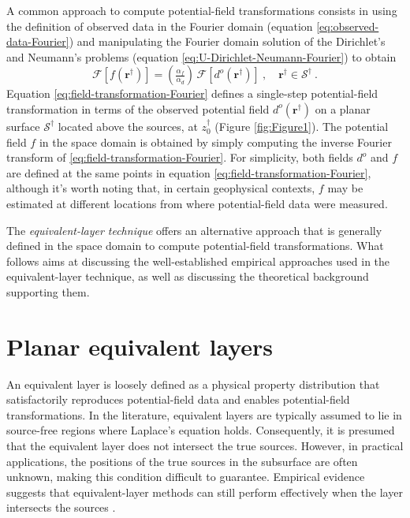\documentclass[manuscript,noblind]{geophysics}
\begin{document}
	A common approach to compute potential-field transformations \cite[e.g.,][]{gunn1975} 
	consists in using the definition of observed data in the Fourier domain (equation \ref{eq:observed-data-Fourier}) 
	and manipulating the Fourier domain solution of the Dirichlet's and Neumann's problems 
	(equation \ref{eq:U-Dirichlet-Neumann-Fourier}) to obtain
	\begin{equation}
		\mathcal{F} [ f(\mathbf{r}^{\dagger}) ] =
		\left( \tfrac{\alpha_{f}}{\alpha_{d}} \right) \, \mathcal{F} \left[ d^{o}(\mathbf{r}^{\dagger}) \right] \: , 
		\quad \mathbf{r}^{\dagger} \in \mathcal{S}^{\dagger} \: .
		\label{eq:field-transformation-Fourier}
	\end{equation}
	Equation \ref{eq:field-transformation-Fourier} defines a single-step potential-field transformation 
	in terms of the observed potential field $d^{o}(\mathbf{r}^{\dagger})$ on a planar surface $\mathcal{S}^{\dagger}$ 
	located above the sources, at $z^{\dagger}_{0}$ (Figure \ref{fig:Figure1}). 
	The potential field $f$ in the space domain is obtained by simply computing the inverse Fourier 
	transform of \ref{eq:field-transformation-Fourier}.
	For simplicity, both fields $d^o$ and $f$ are defined at the same points in equation \ref{eq:field-transformation-Fourier}, 
	although it's worth noting that, in certain geophysical contexts, $f$ may be estimated at different locations from 
	where potential-field data were measured.
	
	The \textit{equivalent-layer technique} offers an alternative approach that is generally defined in the 
	space domain to compute potential-field transformations. What follows aims at discussing the well-established 
	empirical approaches used in the equivalent-layer technique, as well as discussing the theoretical background 
	supporting them.
	
	\section{Planar equivalent layers}
	\label{eq:planar_eqlayer}
	
	An equivalent layer is loosely defined as a physical property distribution that satisfactorily 
	reproduces potential-field data and enables potential-field transformations. 
	In the literature, equivalent layers are typically assumed to lie in source-free regions where 
	Laplace’s equation holds. Consequently, it is presumed that the equivalent layer does not intersect 
	the true sources. However, in practical applications, the positions of the true sources in the subsurface 
	are often unknown, making this condition difficult to guarantee.
	Empirical evidence suggests that equivalent-layer methods can still perform effectively 
	when the layer intersects the sources \citep[e.g.,][]{gonzalez_etal2022}.
	
\end{document}
